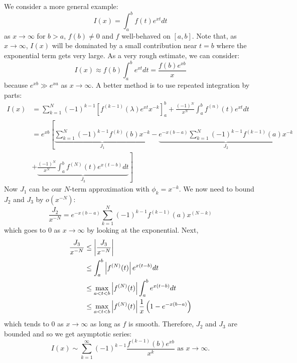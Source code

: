 \documentclass[../Main.tex]{subfiles}
\begin{document}
\begin{example}
    We consider a more general example:
    \begin{equation*}
        I(x) = \int_{a}^{b} f(t)e^{xt} dt 
    \end{equation*}
    as $x \to \infty$ for $b > a$, $f(b) \neq 0$ and $f$ well-behaved on $[a, b]$. Note that, as $x \to \infty$, $I(x)$ will be dominated by a small contribution near $t = b$ where the exponential term gets very large. As a very rough estimate, we can consider:
    \begin{equation*}
        I(x) \approx f(b) \int_{a}^{b} e^{xt} dt = \frac{f(b) e^{xb}}{x}
    \end{equation*}
    because $e^{xb} \gg e^{xa}$ as $x \to \infty$. A better method is to use repeated integration by parts:
    \begin{align*}
        I(x) &= \sum_{k=1}^{N} (-1)^{k-1} \left[f^{(k-1)}(\lambda) e^{xt} x^{-k}\right]_a^b + \frac{(-1)^N}{x^N} \int_{a}^{b} f^{(n)}(t) e^{xt} dt  \\
        &= e^{xb} \left[\underbrace{\sum_{k=1}^{N} (-1)^{k-1} f^{(k)}(b) x^{-k}}_{J_1} - \underbrace{e^{-x(b-a)} \sum_{k=1}^{N} (-1)^{k-1} f^{(k-1)}(a)x^{-k}}_{J_2}\right. \\
        &+ \left.\underbrace{\frac{(-1)^N}{x^N} \int_{a}^{b} f^{(N)}(t) e^{x(t-b)} dt}_{J_3}\right]
    \end{align*}
    Now $J_1$ can be our $N$-term approximation with $\phi_k = x^{-k}$. We now need to bound $J_2$ and $J_3$ by $o(x^{-N})$:
    \begin{equation*}
        \frac{J_2}{x^{-N}} = e^{-x(b-a)} \sum_{k=1}^{N}(-1)^{k-1} f^{(k-1)}(a) x^{(N-k)}
    \end{equation*}
    which goes to $0$ as $x \to \infty$ by looking at the exponential.
    Next,
    \begin{align*}
        \frac{J_3}{x^{-N}} &\leq \left|\frac{J_3}{x^{-N}}\right| \\
        &\leq \int_{a}^{b} \left|f^{(N)}(t)\right| e^{x(t-b)} dt \\
        &\leq \max_{a < t < b} \left|f^{(N)}(t)\right| \int_{a}^{b} e^{x(t-b)} dt \\
        &\leq \max_{a < t < b} \left|f^{(N)}(t)\right| \frac1x \left(1 - e^{-x(b-a)}\right)
    \end{align*}
    which tends to $0$ as $x\to\infty$ as long as $f$ is smooth. Therefore, $J_2$ and $J_3$ are bounded and so we get asymptotic series:
    \begin{equation*}
        I(x) \sim \sum_{k=1}^{\infty} (-1)^{k-1} \frac{f^{(k-1)}(b) e^{xb}}{x^k} \text{ as } x\to\infty.
    \end{equation*}
    \label{exIntParts}
\end{example}
\end{document}
